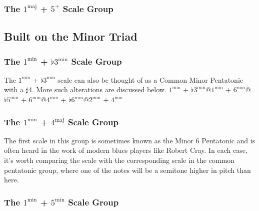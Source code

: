 \documentclass[english]{./gbook}
\begin{document}
\begin{large}
\subsubsection{The $1^{\text{maj}}$ + $5^+$ Scale Group}

\subsection{Built on the Minor Triad}

\subsubsection{The $1^{\text{min}}$ + $\flat3^{\text{min}}$ Scale Group}

The $1^{\text{min}}$ + $\flat3^{\text{min}}$ scale can also be thought of as a Common Minor Pentatonic with a $\sharp$4. More such alterations are discussed below.
$1^{\text{min}}$ + $\flat3^{\text{min}}$@$1^{\text{min}}$ + $6^{\text{min}}$@$\flat 5^{\text{min}}$ + $6^{\text{min}}$@$4^{\text{min}}$ + $\flat 6^{\text{min}}$@$2^{\text{min}}$ + $4^{\text{min}}$%

\subsubsection{The $1^{\text{min}}$ + $4^{\text{maj}}$ Scale Group}
The first scale in this group is sometimes known as the Minor 6 Pentatonic and is often heard in the work of modern blues players like Robert Cray. In each case, it's worth comparing the scale with the corresponding scale in the common pentatonic group, where one of the notes will be a semitone higher in pitch than here.

\subsubsection{The $1^{\text{min}}$ + $5^{\text{min}}$ Scale Group}


\end{large}
\end{document}
